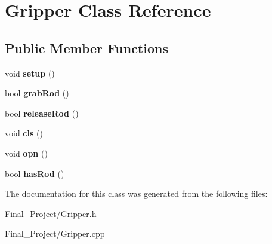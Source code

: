 \hypertarget{classGripper}{\section{Gripper Class Reference}
\label{classGripper}
}
\subsection*{Public Member Functions}
\begin{DoxyCompactItemize}
\item 
\hypertarget{classGripper_a7eff7781d1109b4e988fa66c8141a6d7}{void {\bfseries setup} ()}\label{classGripper_a7eff7781d1109b4e988fa66c8141a6d7}

\item 
\hypertarget{classGripper_ad511d5b78d6163c5900cf20f95aa3d79}{bool {\bfseries grab\-Rod} ()}\label{classGripper_ad511d5b78d6163c5900cf20f95aa3d79}

\item 
\hypertarget{classGripper_aadf861d0fabbd9db21023176b0954c65}{bool {\bfseries release\-Rod} ()}\label{classGripper_aadf861d0fabbd9db21023176b0954c65}

\item 
\hypertarget{classGripper_ada511826dbf5abcdd12532ae725efeaf}{void {\bfseries cls} ()}\label{classGripper_ada511826dbf5abcdd12532ae725efeaf}

\item 
\hypertarget{classGripper_ab4fa689ad3f08e97c7fcd10247965ff5}{void {\bfseries opn} ()}\label{classGripper_ab4fa689ad3f08e97c7fcd10247965ff5}

\item 
\hypertarget{classGripper_a94397923fa8f84c46a482ab2f94573e1}{bool {\bfseries has\-Rod} ()}\label{classGripper_a94397923fa8f84c46a482ab2f94573e1}

\end{DoxyCompactItemize}


The documentation for this class was generated from the following files\-:\begin{DoxyCompactItemize}
\item 
Final\-\_\-\-Project/Gripper.\-h\item 
Final\-\_\-\-Project/Gripper.\-cpp\end{DoxyCompactItemize}
